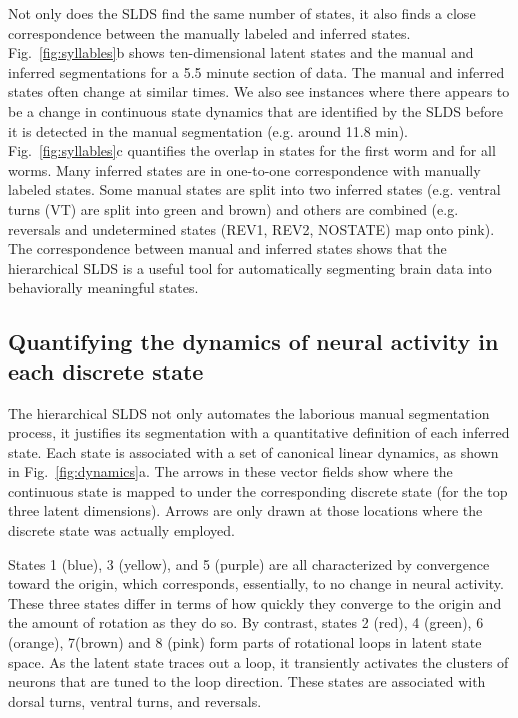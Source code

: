 \documentclass[11pt]{article}
\begin{document}
Not only does the SLDS find the same number of states, it also finds a
close correspondence between the manually labeled and inferred states.
Fig.~\ref{fig:syllables}b shows ten-dimensional latent states and the
manual and inferred segmentations for a 5.5 minute section of data.
The manual and inferred states often change at similar times. We also
see instances where there appears to be a change in continuous state
dynamics that are identified by the SLDS before it is detected in the
manual segmentation (e.g. around 11.8 min).  Fig.~\ref{fig:syllables}c
quantifies the overlap in states for the first worm and for all worms.
Many inferred states are in one-to-one correspondence with manually
labeled states. Some manual states are split into two inferred states
(e.g. ventral turns (\textsf{VT}) are split into green and brown) and
others are combined (e.g. reversals and undetermined states
(\textsf{REV1}, \textsf{REV2}, \textsf{NOSTATE}) map onto pink).
The correspondence between manual and inferred states shows that
the hierarchical SLDS is a useful tool for automatically segmenting
brain data into behaviorally meaningful states.


\subsection*{Quantifying the dynamics of neural activity in each discrete state}
The hierarchical SLDS not only automates the laborious manual
segmentation process, it justifies its segmentation with a
quantitative definition of each inferred state. Each state is
associated with a set of canonical linear dynamics, as shown in
Fig.~\ref{fig:dynamics}a. The arrows in these vector fields show where
the continuous state is mapped to under the corresponding discrete
state (for the top three latent dimensions).  Arrows are only drawn
at those locations where the discrete state was actually employed.

States 1 (blue), 3 (yellow), and 5 (purple) are all characterized
by convergence toward the origin, which corresponds, essentially, to
no change in neural activity. These three states differ in terms of how
quickly they converge to the origin and the amount of rotation as
they do so.  By contrast, states 2 (red), 4 (green), 6 (orange), 7(brown)
and 8 (pink) form parts of rotational loops in latent state space.
As the latent state traces out a loop, it transiently activates
the clusters of neurons that are tuned to the loop direction.
These states are associated with dorsal turns, ventral turns, and
reversals.
\end{document}
